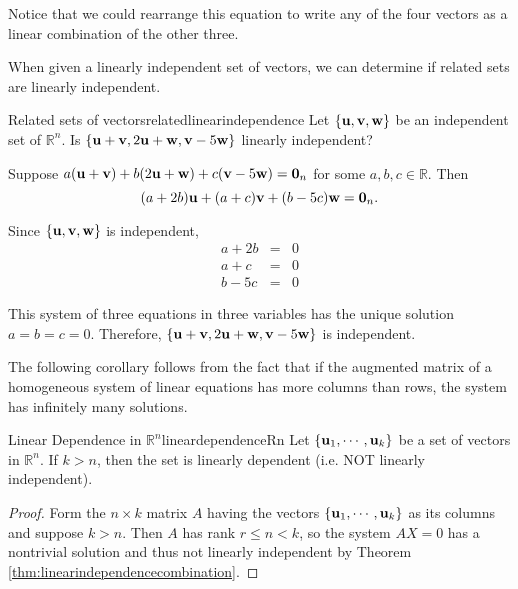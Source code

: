 \begin{solution}
Notice that we could rearrange this equation to write any of the four vectors as a linear combination of the other three. 
\end{solution}

When given a linearly independent set of vectors, we can determine if related sets are linearly independent. 

\begin{example}{Related sets of vectors}{relatedlinearindependence}
Let $\{ {\bf u},{\bf v},{\bf w}\}$ be an independent set of $\mathbb{R}^n$.
Is $\{{\bf u}+{\bf v}, 2{\bf u}+{\bf w}, {\bf v}-5{\bf w}\}$ linearly
independent?
\end{example}

\begin{solution}
Suppose $a({\bf u}+{\bf v}) + b(2{\bf u}+{\bf w}) + c({\bf v}-5{\bf w})={\bf 0}_n$
for some $a,b,c\in\mathbb{R}$.
Then 
\[ (a+2b){\bf u} + (a+c){\bf v} + (b-5c){\bf w}={\bf 0}_n.\]

Since $\{{\bf u},{\bf v},{\bf w}\}$ is independent, 
\begin{eqnarray*}
a + 2b & = & 0 \\
a + c & = & 0 \\
b - 5c & = & 0 
\end{eqnarray*}

This system of three equations in three variables has 
the unique solution $a=b=c=0$.
Therefore, $\{{\bf u}+{\bf v}, 2{\bf u}+{\bf w}, {\bf v}-5{\bf w}\}$ is independent.
\end{solution}

The following corollary follows from the fact that if the augmented matrix of a homogeneous
system of linear equations has more columns than rows, the system has infinitely many
solutions.

\begin{corollary}{Linear Dependence in $\mathbb{R}^{n}$}{lineardependenceRn}
Let $\left\{ {\bf u}_{1},\cdots ,{\bf u}_{k}\right\} $
be a set of vectors in $\mathbb{R}^{n}$. 
If $k>n$, then the set is linearly dependent (i.e. NOT linearly independent).
\end{corollary}

\begin{proof}
Form the $n \times k$ matrix $A$ having the vectors $\left\{
{\bf u}_{1},\cdots ,{\bf u}_{k}\right\} $ as its columns and suppose $k > n$. Then $A$ has rank $r \leq n <k$, so 
the system $AX=0$ has a nontrivial solution %
 and thus not linearly independent by Theorem 
 \ref{thm:linearindependencecombination}.
\end{proof}

